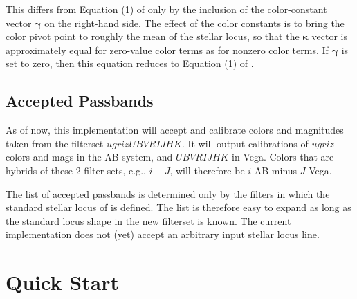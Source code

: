\documentclass{report}
\newcommand{\zptcolor}{\boldsymbol{\kappa}}
\newcommand{\colorconst}{\boldsymbol{\gamma}}
\begin{document}
This differs from Equation (1) of \citet{bib:slr} only by the
inclusion of the color-constant vector $\colorconst$ on the right-hand
side.  The effect of the color constants is to bring the color pivot
point to roughly the mean of the stellar locus, so that the
$\zptcolor$ vector is approximately equal for zero-value color terms
as for nonzero color terms.  If $\colorconst$ is set to zero, then
this equation reduces to Equation (1) of \citet{bib:slr}.

\section{Accepted Passbands}

As of now, this implementation will accept and calibrate colors and
magnitudes taken from the filterset $ugrizUBVRIJHK$.  It will output
calibrations of $ugriz$ colors and mags in the AB system, and
$UBVRIJHK$ in Vega.  Colors that are hybrids of these 2 filter sets,
e.g., $i-J$, will therefore be $i$ AB minus $J$ Vega.

The list of accepted passbands is determined only by the filters in
which the standard stellar locus of \citet{bib:covey} is defined.  The
list is therefore easy to expand as long as the standard locus shape
in the new filterset is known.  The current implementation does not
(yet) accept an arbitrary input stellar locus line.



\chapter{Quick Start}
\end{document}
